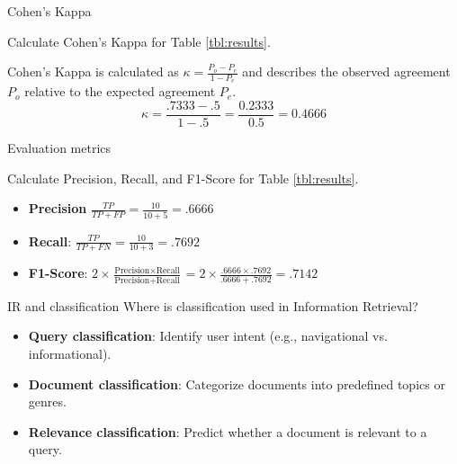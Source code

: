 \documentclass{article}
\begin{document}
\begin{exercise}{Cohen's Kappa}
  
  Calculate Cohen's Kappa for Table \ref{tbl:results}.

  \begin{solution}
    Cohen's Kappa is calculated as $\kappa = \frac{P_o - P_e}{1 - P_e}$ and describes the observed agreement $P_o$ relative to the expected agreement $P_e$.
      \[ \kappa = \frac{.7333-.5}{1-.5} = \frac{0.2333}{0.5} = 0.4666 \]
  \end{solution}
\end{exercise}

\begin{exercise}{Evaluation metrics}
  
  Calculate Precision, Recall, and F1-Score for Table \ref{tbl:results}.

  \begin{solution}
    \begin{itemize}
        \item \textbf{Precision} $\frac{TP}{TP + FP} = \frac{10}{10+5} = .6666$
        \item \textbf{Recall}: $\frac{TP}{TP + FN} = \frac{10}{10+3} = .7692$
        \item \textbf{F1-Score}: $2 \times \frac{\text{Precision} \times \text{Recall}}{\text{Precision} + \text{Recall}} = 2 \times \frac{.6666 \times .7692}{.6666 + .7692} = .7142$
    \end{itemize}
  \end{solution}
\end{exercise}

\begin{exercise}{IR and classification}
  Where is classification used in Information Retrieval?

  \begin{solution}
    \begin{itemize}
        \item \textbf{Query classification}: Identify user intent (e.g., navigational vs. informational).
        \item \textbf{Document classification}: Categorize documents into predefined topics or genres.
        \item \textbf{Relevance classification}: Predict whether a document is relevant to a query.
    \end{itemize}
  \end{solution}
\end{exercise}
\end{document}
